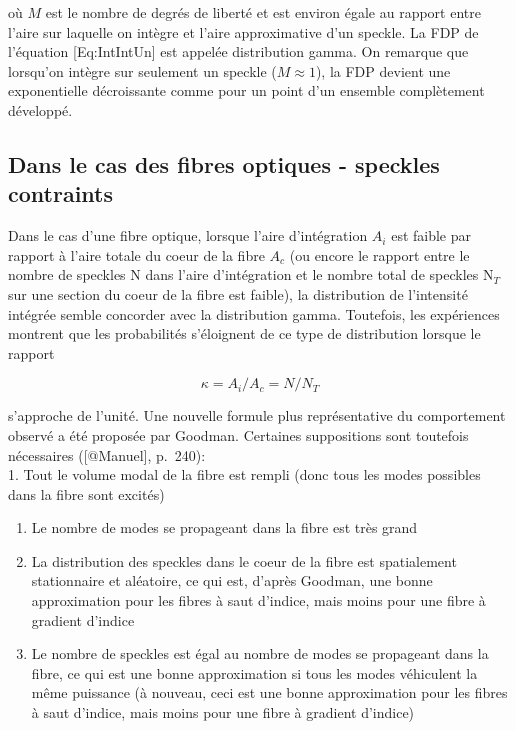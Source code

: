 \documentclass[]{article}
\begin{document}
où \(M\) est le nombre de degrés de liberté et est environ égale au
rapport entre l'aire sur laquelle on intègre et l'aire approximative
d'un speckle. La FDP de l'équation {[}Eq:IntIntUn{]} est appelée
distribution gamma. On remarque que lorsqu'on intègre sur seulement un
speckle (\(M\approx1\)), la FDP devient une exponentielle décroissante
comme pour un point d'un ensemble complètement développé.

\subsection{Dans le cas des fibres optiques - speckles
contraints}\label{Sec:SpeckCons}

Dans le cas d'une fibre optique, lorsque l'aire d'intégration \(A_i\)
est faible par rapport à l'aire totale du coeur de la fibre \(A_c\) (ou
encore le rapport entre le nombre de speckles N dans l'aire
d'intégration et le nombre total de speckles N\(_T\) sur une section du
coeur de la fibre est faible), la distribution de l'intensité intégrée
semble concorder avec la distribution gamma. Toutefois, les expériences
montrent que les probabilités s'éloignent de ce type de distribution
lorsque le rapport

\[
\kappa = A_{i}/A_{c} = N/N_{T}
\]

s'approche de l'unité. Une nouvelle formule plus représentative du
comportement observé a été proposée par Goodman. Certaines suppositions
sont toutefois nécessaires ({[}@Manuel{]}, p.~240):\\
1. Tout le volume modal de la fibre est rempli (donc tous les modes
possibles dans la fibre sont excités)

\begin{enumerate}
\def\labelenumi{\arabic{enumi}.}
\setcounter{enumi}{1}
\item
  Le nombre de modes se propageant dans la fibre est très grand
\item
  La distribution des speckles dans le coeur de la fibre est
  spatialement stationnaire et aléatoire, ce qui est, d'après Goodman,
  une bonne approximation pour les fibres à saut d'indice, mais moins
  pour une fibre à gradient d'indice
\item
  Le nombre de speckles est égal au nombre de modes se propageant dans
  la fibre, ce qui est une bonne approximation si tous les modes
  véhiculent la même puissance (à nouveau, ceci est une bonne
  approximation pour les fibres à saut d'indice, mais moins pour une
  fibre à gradient d'indice)
\end{enumerate}
\end{document}
